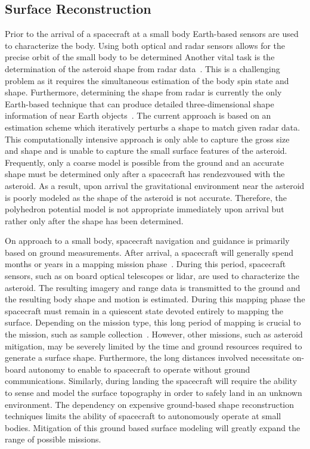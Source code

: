
\subsection{Surface Reconstruction}

Prior to the arrival of a spacecraft at a small body Earth-based sensors are used to characterize the body.
Using both optical and radar sensors allows for the precise orbit of the small body to be determined
Another vital task is the determination of the asteroid shape from radar data~\cite{hudson1994,busch2011}.
This is a challenging problem as it requires the simultaneous estimation of the body spin state and shape.
Furthermore, determining the shape from radar is currently the only Earth-based technique that can produce detailed three-dimensional shape information of near Earth objects~\cite{greenberg2015}.
The current approach is based on an estimation scheme which iteratively perturbs a shape to match given radar data.
This computationally intensive approach is only able to capture the gross size and shape and is unable to capture the small surface features of the asteroid.
Frequently, only a coarse model is possible from the ground and an accurate shape must be determined only after a spacecraft has rendezvoused with the asteroid.
As a result, upon arrival the gravitational environment near the asteroid is poorly modeled as the shape of the asteroid is not accurate.
Therefore, the polyhedron potential model is not appropriate immediately upon arrival but rather only after the shape has been determined.

On approach to a small body, spacecraft navigation and guidance is primarily based on ground measurements.
After arrival, a spacecraft will generally spend months or years in a mapping mission phase~\cite{kubota2003,cole1998}.
During this period, spacecraft sensors, such as on board optical telescopes or \gls{lidar}, are used to characterize the asteroid.
The resulting imagery and range data is transmitted to the ground and the resulting body shape and motion is estimated. 
During this mapping phase the spacecraft must remain in a quiescent state devoted entirely to mapping the surface.
Depending on the mission type, this long period of mapping is crucial to the mission, such as sample collection~\cite{gates2015}. 
However, other missions, such as asteroid mitigation, may be severely limited by the time and ground resources required to generate a surface shape.
Furthermore, the long distances involved necessitate on-board autonomy to enable to spacecraft to operate without ground communications.
Similarly, during landing the spacecraft will require the ability to sense and model the surface topography in order to safely land in an unknown environment.
The dependency on expensive ground-based shape reconstruction techniques limits the ability of spacecraft to autonomously operate at small bodies.
Mitigation of this ground based surface modeling will greatly expand the range of possible missions.


